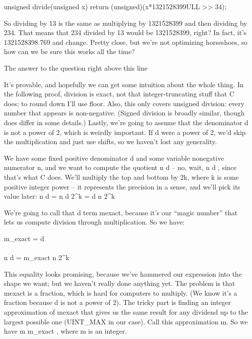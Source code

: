 unsigned divide(unsigned x) {
   return (unsigned)(x*1321528399ULL >> 34);
}

So dividing by 13 is the same as multiplying by 1321528399 and then dividing by 234. That means that 234 divided by 13 would be 1321528399, right? In fact, it’s 1321528398.769 and change. Pretty close, but we’re not optimizing horseshoes, so how can we be sure this works all the time?
 
The answer to the question right above this line

It’s provable, and hopefully we can get some intuition about the whole thing. In the following proof, division is exact, not that integer-truncating stuff that C does; to round down I’ll use floor. Also, this only covers unsigned division: every number that appears is non-negative. (Signed division is broadly similar, though does differ in some details.) Lastly, we’re going to assume that the denominator d is not a power of 2, which is weirdly important. If d were a power of 2, we’d skip the multiplication and just use shifts, so we haven’t lost any generality.

We have some fixed positive denominator d and some variable nonegative numerator n, and we want to compute the quotient \frac n d – no, wait, \lfloor \frac n d \rfloor, since that’s what C does. We’ll multiply the top and bottom by 2k, where k is some positive integer power – it represents the precision in a sense, and we’ll pick its value later:
\lfloor \frac n d \rfloor = \lfloor \frac n d \times {} {2^k} \rfloor = \lfloor {} d \times \frac n {2^k} \rfloor

We’re going to call that  d term mexact, because it’s our “magic number” that lets us compute division through multiplication. So we have:

m_{exact} =  d \\\\ \lfloor \frac n d \rfloor = \lfloor m_{exact} \times \frac n {2^k} \rfloor

This equality looks promising, because we’ve hammered our expression into the shape we want; but we haven’t really done anything yet. The problem is that mexact is a fraction, which is hard for computers to multiply. (We know it’s a fraction because d is not a power of 2). The tricky part is finding an integer approximation of mexact that gives us the same result for any dividend up to the largest possible one (UINT_MAX in our case). Call this approximation m. So we have m \approx m_{exact} , where m is an integer.

